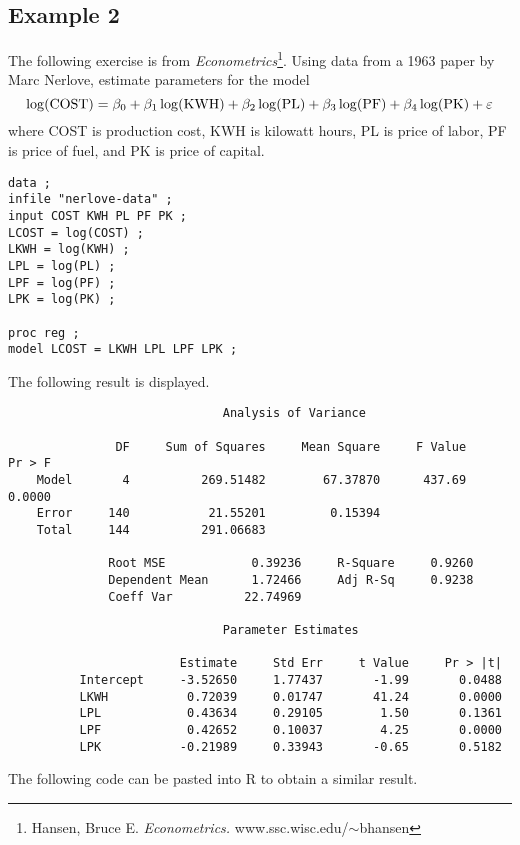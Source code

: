 \documentclass[12pt]{article}
\begin{document}
\subsection*{Example 2}

The following exercise is from {\it Econometrics}\footnote{
Hansen, Bruce E. {\it Econometrics.}
www.ssc.wisc.edu/$\sim$bhansen}.
Using data from a 1963 paper by Marc Nerlove,
estimate parameters for the model
\[
\log({\rm COST})=\beta_0+\beta_1\log({\rm KWH})
+\beta_2\log({\rm PL})+\beta_3\log({\rm PF})+\beta_4\log({\rm PK})
+\varepsilon
\]
where COST is production cost,
KWH is kilowatt hours,
PL is price of labor,
PF is price of fuel,
and PK is price of capital.

{\scriptsize\begin{verbatim}
data ;
infile "nerlove-data" ;
input COST KWH PL PF PK ;
LCOST = log(COST) ;
LKWH = log(KWH) ;
LPL = log(PL) ;
LPF = log(PF) ;
LPK = log(PK) ;

proc reg ;
model LCOST = LKWH LPL LPF LPK ;
\end{verbatim}}

The following result is displayed.

{\scriptsize\begin{verbatim}
                              Analysis of Variance

               DF     Sum of Squares     Mean Square     F Value     Pr > F
    Model       4          269.51482        67.37870      437.69     0.0000
    Error     140           21.55201         0.15394                       
    Total     144          291.06683                                       

              Root MSE            0.39236     R-Square     0.9260
              Dependent Mean      1.72466     Adj R-Sq     0.9238
              Coeff Var          22.74969                        

                              Parameter Estimates

                        Estimate     Std Err     t Value     Pr > |t|
          Intercept     -3.52650     1.77437       -1.99       0.0488
          LKWH           0.72039     0.01747       41.24       0.0000
          LPL            0.43634     0.29105        1.50       0.1361
          LPF            0.42652     0.10037        4.25       0.0000
          LPK           -0.21989     0.33943       -0.65       0.5182
\end{verbatim}}

The following code can be pasted into R to obtain a similar result.
\end{document}
